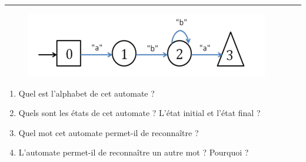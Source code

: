 \newcommand{\numTD}{TD1}
\newcommand{\themeTD}{Machines de Turing, automates à états finis}


\hrule

\noindent{}

\exer
\vspace{-0.5cm}
\begin{figure}[h]
\includegraphics[width=.6\textwidth]{./images/TD1_1.png}
\end{figure}
\vspace{-0.5cm}

\begin{enumerate}
 \item Quel est l'alphabet de cet automate ?
 \item Quels sont les états de cet automate ? L'état initial et l'état final ?
 \item Quel mot cet automate permet-il de reconnaître ?
 \item L'automate permet-il de reconnaître un autre mot ? Pourquoi ?
\end{enumerate}

